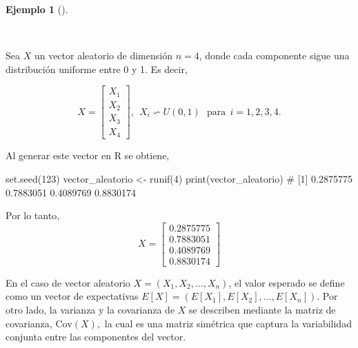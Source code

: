 \documentclass[
  us-letterpaper,
]{scrreprt}
\newenvironment{Shaded}{\begin{snugshade}}{\end{snugshade}}
\newcommand{\CommentTok}[1]{\textcolor[rgb]{0.37,0.37,0.37}{#1}}
\newcommand{\DecValTok}[1]{\textcolor[rgb]{0.68,0.00,0.00}{#1}}
\newcommand{\FunctionTok}[1]{\textcolor[rgb]{0.28,0.35,0.67}{#1}}
\newcommand{\NormalTok}[1]{\textcolor[rgb]{0.00,0.23,0.31}{#1}}
\newcommand{\OtherTok}[1]{\textcolor[rgb]{0.00,0.23,0.31}{#1}}
\theoremstyle{plain}
\theoremstyle{definition}
\theoremstyle{definition}
\newtheorem{example}{Ejemplo}[chapter]
\theoremstyle{remark}
\begin{document}
\begin{example}[]\protect\hypertarget{exm-EVA}{}\label{exm-EVA}

~

\begin{tcolorbox}[enhanced jigsaw, colback=white, toptitle=1mm, arc=.35mm, rightrule=.15mm, left=2mm, colframe=quarto-callout-caution-color-frame, breakable, leftrule=.75mm, colbacktitle=quarto-callout-caution-color!10!white, coltitle=black, opacityback=0, bottomtitle=1mm, bottomrule=.15mm, titlerule=0mm, opacitybacktitle=0.6, toprule=.15mm, title={Ejemplo de un vector aleatorio}]

Sea \(X\) un vector aleatorio de dimensión \(n = 4\), donde cada
componente sigue una distribución uniforme entre 0 y 1. Es decir,

\[ X =\begin{bmatrix}
X_1 \\
X_2 \\
X_3 \\
X_4
\end{bmatrix}, \ \ X_i \backsim U(0,1) \ \ \ \text{para} \ \ i=1,2,3,4.\]

Al generar este vector en R se obtiene,

\begin{Shaded}
\begin{Highlighting}[]
\FunctionTok{set.seed}\NormalTok{(}\DecValTok{123}\NormalTok{)}
\NormalTok{vector\_aleatorio }\OtherTok{\textless{}{-}} \FunctionTok{runif}\NormalTok{(}\DecValTok{4}\NormalTok{)}
\FunctionTok{print}\NormalTok{(vector\_aleatorio)}
\CommentTok{\# [1] 0.2875775 0.7883051 0.4089769 0.8830174}
\end{Highlighting}
\end{Shaded}

Por lo tanto, \[
X =\begin{bmatrix}
0.2875775 \\
0.7883051 \\
0.4089769 \\
0.8830174
\end{bmatrix}
\]

\end{tcolorbox}

\end{example}

En el caso de vector aleatorio \(X = (X_1,X_2, \dots, X_n)\), el valor
esperado se define como un vector de expectativas
\(E[X] = (E[X_1],E[X_2], \dots, E[X_n]).\) Por otro lado, la varianza y
la covarianza de \(X\) se describen mediante la matriz de covarianza,
\(\text{Cov}(X),\) la cual es una matriz simétrica que captura la
variabilidad conjunta entre las componentes del vector.
\end{document}
